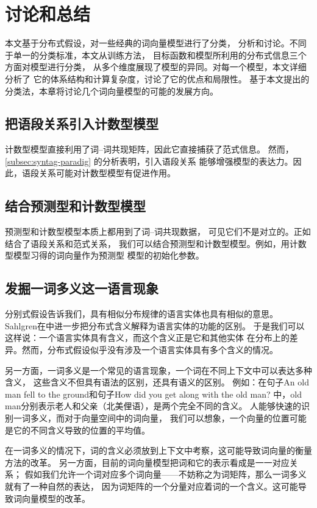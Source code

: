 \section{讨论和总结}
\label{sec:diss-and-concl}
本文基于分布式假设，对一些经典的词向量模型进行了分类，
分析和讨论。不同于单一的分类标准，本文从训练方法，
目标函数和模型所利用的分布式信息三个方面对模型进行分类，
从多个维度展现了模型的异同。对每一个模型，本文详细分析了
它的体系结构和计算复杂度，讨论了它的优点和局限性。
基于本文提出的分类法，本章将讨论几个词向量模型的可能的发展方向。

\subsection{把语段关系引入计数型模型}
计数型模型直接利用了词--词共现矩阵，因此它直接捕获了范式信息。
然而，\cref{subsec:syntag-paradig} 的分析表明，引入语段关系
能够增强模型的表达力。因此，语段关系可能对计数型模型有促进作用。

\subsection{结合预测型和计数型模型}
预测型和计数型模型本质上都用到了词--词共现数据\cite{pennington2014glove}，
可见它们不是对立的。正如\cite{pmlr-v22-bordes12}结合了语段关系和范式关系，
我们可以结合预测型和计数型模型。例如，用计数型模型习得的词向量作为预测型
模型的初始化参数。

\subsection{发掘一词多义这一语言现象}
分别式假设告诉我们，具有相似分布规律的语言实体也具有相似的意思。
Sahlgren在\cite{Sahlgren2008}中进一步把分布式含义解释为语言实体的功能的区别。
于是我们可以这样说：一个语言实体具有含义，而这个含义正是它和其他实体
在分布上的差异。然而，分布式假设似乎没有涉及一个语言实体具有多个含义的情况。

另一方面，一词多义是一个常见的语言现象，一个词在不同上下文中可以表达多种含义，
这些含义不但具有语法的区别，还具有语义的区别。
例如：在句子An old man fell to the ground和句子How did you get along with the old man?
中，old man分别表示老人和父亲（北美俚语），是两个完全不同的含义。
人能够快速的识别一词多义，而对于向量空间中的词向量，
我们可以想象，一个向量的位置可能是它的不同含义导致的位置的平均值。

在一词多义的情况下，词的含义必须放到上下文中考察，这可能导致词向量的衡量方法的改革。
另一方面，目前的词向量模型把词和它的表示看成是一一对应关系；
假如我们允许一个词对应多个词向量——不妨称之为词矩阵，那么一词多义就有了一种自然的表达，
因为词矩阵的一个分量对应着词的一个含义。这可能导致词向量模型的改革。
